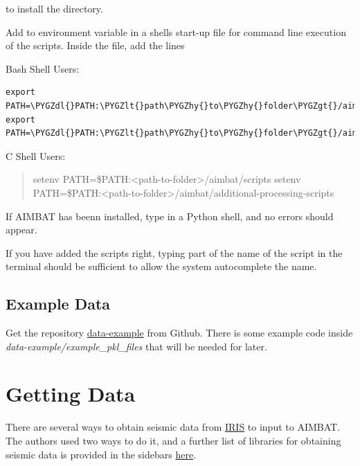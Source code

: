 \documentclass[letterpaper,10pt,english]{sphinxmanual}
\def\PYGZlt{\char`\<}
\def\PYGZgt{\char`\>}
\def\PYGZdl{\char`\$}
\def\PYGZhy{\char`\-}
\begin{document}
to install the  directory.

Add  to environment variable  in a shells start-up file for command line execution of the scripts. Inside the  file, add the lines

Bash Shell Users:

\begin{Verbatim}[commandchars=\\\{\}]
export PATH=\PYGZdl{}PATH:\PYGZlt{}path\PYGZhy{}to\PYGZhy{}folder\PYGZgt{}/aimbat/scripts
export PATH=\PYGZdl{}PATH:\PYGZlt{}path\PYGZhy{}to\PYGZhy{}folder\PYGZgt{}/aimbat/additional\PYGZhy{}processing\PYGZhy{}scripts
\end{Verbatim}

C Shell Users:
\begin{quote}

setenv PATH=\$PATH:\textless{}path-to-folder\textgreater{}/aimbat/scripts
setenv PATH=\$PATH:\textless{}path-to-folder\textgreater{}/aimbat/additional-processing-scripts
\end{quote}

If AIMBAT has beenn installed, type  in a Python shell, and no errors should appear.

If you have added the scripts right, typing part of the name of the script in the terminal should be sufficient to allow the system autocomplete the name.


\section{Example Data}
\label{docfiles/install_aimbat:example-data}
Get the repository \href{https://github.com/pysmo/data-example}{data-example} from Github. There is some example code inside \emph{data-example/example\_pkl\_files} that will be needed for later.


\chapter{Getting Data}
\label{docfiles/gettingData:getting-data}\label{docfiles/gettingData::doc}
There are several ways to obtain seismic data from \href{http://www.iris.edu/dms/nodes/dmc/data/types/waveform-data/}{IRIS} to input to AIMBAT. The authors used two ways to do it, and a further list of libraries for obtaining seismic data is provided in the sidebars \href{http://www.iris.edu/dms/nodes/dmc/data/types/waveform-data/}{here}.
\end{document}
